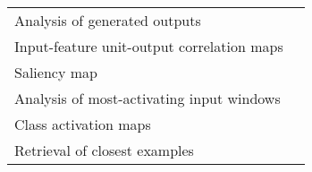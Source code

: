 \begin{tabular}{ll}
Analysis of generated outputs                          &                                                                                                                                                                               \cite{Hartmann2018} \\
Input-feature unit-output correlation maps             &                                                                                                                                                                          \cite{Schirrmeister2017} \\
Saliency map                                           &                                                                                                                                                                               \cite{Vilamala2017} \\
Analysis of most-activating input windows              &                                                                                                                                                                              \cite{Hartmann2018b} \\
Class activation maps                                  &                                                                                                                                                                                  \cite{Ghosh2018} \\
Retrieval of closest examples                          &                                                                                                                                                                                  \cite{Deiss2018} \\
\bottomrule
\end{tabular}
